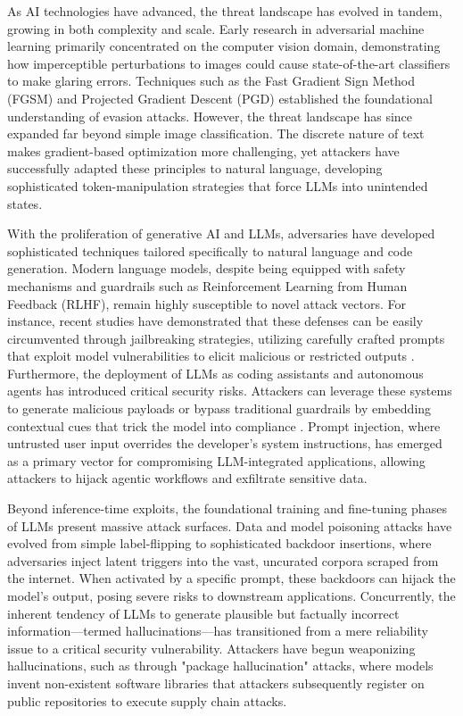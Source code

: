 \documentclass[11pt,a4paper]{article}
\begin{document}
As AI technologies have advanced, the threat landscape has evolved in tandem, growing in both complexity and scale. Early research in adversarial machine learning primarily concentrated on the computer vision domain, demonstrating how imperceptible perturbations to images could cause state-of-the-art classifiers to make glaring errors. Techniques such as the Fast Gradient Sign Method (FGSM) and Projected Gradient Descent (PGD) established the foundational understanding of evasion attacks. However, the threat landscape has since expanded far beyond simple image classification. The discrete nature of text makes gradient-based optimization more challenging, yet attackers have successfully adapted these principles to natural language, developing sophisticated token-manipulation strategies that force LLMs into unintended states.

With the proliferation of generative AI and LLMs, adversaries have developed sophisticated techniques tailored specifically to natural language and code generation. Modern language models, despite being equipped with safety mechanisms and guardrails such as Reinforcement Learning from Human Feedback (RLHF), remain highly susceptible to novel attack vectors. For instance, recent studies have demonstrated that these defenses can be easily circumvented through jailbreaking strategies, utilizing carefully crafted prompts that exploit model vulnerabilities to elicit malicious or restricted outputs \cite{Muntasir_2025_Mocha}. Furthermore, the deployment of LLMs as coding assistants and autonomous agents has introduced critical security risks. Attackers can leverage these systems to generate malicious payloads or bypass traditional guardrails by embedding contextual cues that trick the model into compliance \cite{Noever_2024_AI}. Prompt injection, where untrusted user input overrides the developer's system instructions, has emerged as a primary vector for compromising LLM-integrated applications, allowing attackers to hijack agentic workflows and exfiltrate sensitive data.

Beyond inference-time exploits, the foundational training and fine-tuning phases of LLMs present massive attack surfaces. Data and model poisoning attacks have evolved from simple label-flipping to sophisticated backdoor insertions, where adversaries inject latent triggers into the vast, uncurated corpora scraped from the internet. When activated by a specific prompt, these backdoors can hijack the model's output, posing severe risks to downstream applications. Concurrently, the inherent tendency of LLMs to generate plausible but factually incorrect information---termed hallucinations---has transitioned from a mere reliability issue to a critical security vulnerability. Attackers have begun weaponizing hallucinations, such as through "package hallucination" attacks, where models invent non-existent software libraries that attackers subsequently register on public repositories to execute supply chain attacks.
\end{document}
